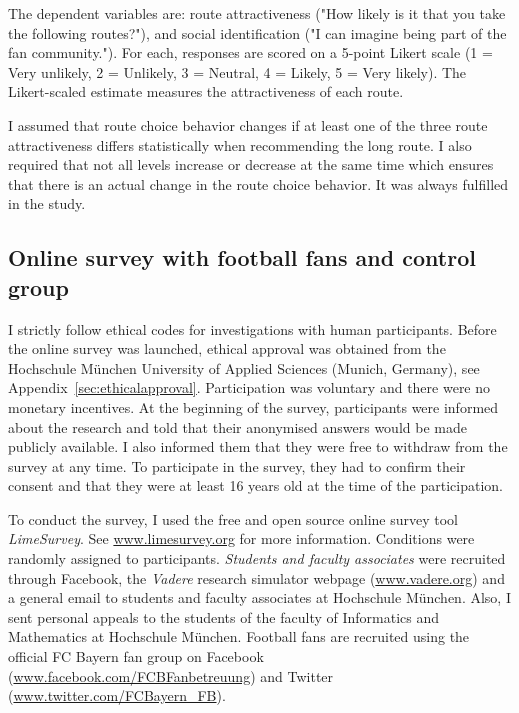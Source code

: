 The dependent variables are: route attractiveness ("How likely is it that you take the following routes?"), and social identification ("I can imagine being part of the fan community."). For each, responses are scored on a 5-point Likert scale (1 = Very unlikely, 2 = Unlikely, 3 = Neutral, 4 = Likely, 5 = Very likely). The Likert-scaled estimate measures the attractiveness of each route.


\newpage
I assumed that route choice behavior changes if at least one of the three route attractiveness differs statistically when recommending the long route. I also required that not all levels increase or decrease at the same time which ensures that there is an actual change in the route choice behavior. It was always fulfilled in the study.






\subsection{Online survey with football fans and control group}
I strictly follow ethical codes for investigations with human participants. Before the online survey was launched, ethical approval was obtained from the Hochschule M\"{u}nchen University of Applied Sciences (Munich, Germany), see Appendix~\ref{sec:ethicalapproval}. Participation was voluntary and there were no monetary incentives. At the beginning of the survey, participants were informed about the research and told that their anonymised answers would be made publicly available. I also informed them that they were free to withdraw from the survey at any time. 
To participate in the survey, they had to confirm their consent and that they were at least 16 years old at the time of the participation. 


To conduct the survey, I used the free and open source online survey tool \textit{LimeSurvey}. See \url{www.limesurvey.org} for more information. Conditions were randomly assigned  to participants.
%
\textit{Students and faculty associates} were recruited through  
Facebook, the \textit{Vadere} research simulator webpage (\url{www.vadere.org}) and a general email to students and faculty associates at Hochschule M\"{u}nchen. Also, I sent personal appeals to the students of the faculty of Informatics and Mathematics at Hochschule München. 
%
Football fans are recruited using the official FC Bayern fan group on Facebook (\url{www.facebook.com/FCBFanbetreuung}) and Twitter (\url{www.twitter.com/FCBayern_FB}).

